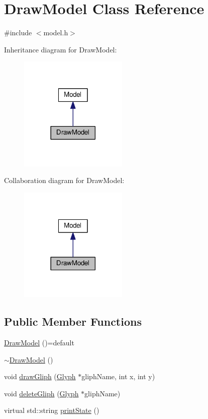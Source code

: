 \hypertarget{classDrawModel}{\section{Draw\-Model Class Reference}
\label{classDrawModel}
}


{\ttfamily \#include $<$model.\-h$>$}



Inheritance diagram for Draw\-Model\-:
\nopagebreak
\begin{figure}[H]
\begin{center}
\leavevmode
\includegraphics[width=146pt]{classDrawModel__inherit__graph}
\end{center}
\end{figure}


Collaboration diagram for Draw\-Model\-:
\nopagebreak
\begin{figure}[H]
\begin{center}
\leavevmode
\includegraphics[width=146pt]{classDrawModel__coll__graph}
\end{center}
\end{figure}
\subsection*{Public Member Functions}
\begin{DoxyCompactItemize}
\item 
\hyperlink{classDrawModel_ad3a824bc973a552db96e0bce14ebc5de}{Draw\-Model} ()=default
\item 
\hyperlink{classDrawModel_aead59f7f6d9d39157176d730e0ab1f31}{$\sim$\-Draw\-Model} ()
\item 
void \hyperlink{classDrawModel_a7130384b7d81e918beef2fb62d8fa21b}{draw\-Gliph} (\hyperlink{classGlyph}{Glyph} $\ast$gliph\-Name, int x, int y)
\item 
void \hyperlink{classDrawModel_a29b8a3f96a9ae3778f69dc37455c0c34}{delete\-Gliph} (\hyperlink{classGlyph}{Glyph} $\ast$gliph\-Name)
\item 
virtual std\-::string \hyperlink{classDrawModel_a64d70716532d50216910f4c37b75da32}{print\-State} ()
\end{DoxyCompactItemize}
